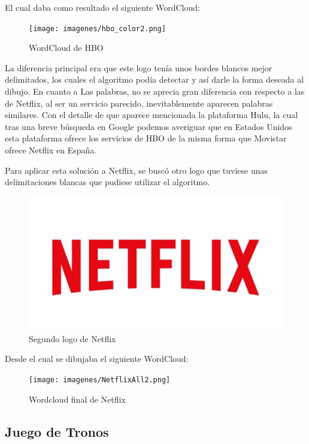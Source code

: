 El cual daba como resultado el siguiente WordCloud: 

\begin{figure}[h]
	\centering
	\texttt{[image: imagenes/hbo\_color2.png]}
	\caption{WordCloud de HBO}
	\label{fig:wordcloudHBO}
\end{figure} 

La diferencia principal era que este logo tenía unos bordes blancos mejor delimitados, los cuales el algoritmo podía detectar y así darle la forma deseada al dibujo. En cuanto a Las palabras, no se aprecia gran diferencia con respecto a las de Netflix, al ser un servicio parecido, inevitablemente aparecen palabras similares. Con el detalle de que aparece mencionada la plataforma Hulu, la cual tras una breve búsqueda en Google podemos averiguar que en Estados Unidos esta plataforma ofrece los servicios de HBO de la misma forma que Movistar ofrece Netflix en España. 

Para aplicar esta solución a Netflix, se buscó otro logo que tuviese unas delimitaciones blancas que pudiese utilizar el algoritmo. 

\begin{figure}[H]
	\centering
	\includegraphics[scale=.35]{imagenes/netf.jpeg}
	\caption{Segundo logo de Netflix}
	\label{fig:logonetflix2}
\end{figure} 

Desde el cual se dibujaba el siguiente WordCloud: 

\begin{figure}[H]
	\centering
	\texttt{[image: imagenes/NetflixAll2.png]}
	\caption{Wordcloud final de Netflix}
	\label{fig:wordcloudNetflix}
\end{figure} 




\subsection{Juego de Tronos}

